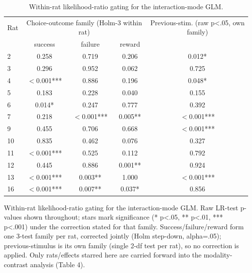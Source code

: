 \begin{table}[htbp]
\centering
\caption{Within-rat likelihood-ratio gating for the interaction-mode GLM.}
\label{tab:lr_gating}
\begin{tabular}{lcccc}
\toprule
Rat & \multicolumn{3}{c}{Choice-outcome family (Holm-3 within rat)} & Previous-stim. (raw p<.05, own family) \\
 & success & failure & reward &  \\
\midrule
2 & 0.258 & 0.719 & 0.206 & 0.012* \\
3 & 0.296 & 0.952 & 0.062 & 0.725 \\
4 & $<$0.001*** & 0.886 & 0.196 & 0.048* \\
5 & 0.183 & 0.228 & 0.040 & 0.155 \\
6 & 0.014* & 0.247 & 0.777 & 0.392 \\
7 & 0.218 & $<$0.001*** & 0.005** & $<$0.001*** \\
9 & 0.455 & 0.706 & 0.668 & $<$0.001*** \\
10 & 0.835 & 0.462 & 0.076 & 0.327 \\
11 & $<$0.001*** & 0.525 & 0.112 & 0.792 \\
12 & 0.445 & 0.886 & 0.001** & 0.924 \\
13 & $<$0.001*** & 0.003** & 1.000 & $<$0.001*** \\
16 & $<$0.001*** & 0.007** & 0.037* & 0.856 \\
\bottomrule
\end{tabular}
\vspace{4pt}
\par\noindent
\begin{minipage}{\linewidth}\small Within-rat likelihood-ratio gating for the interaction-mode GLM. Raw LR-test p-values shown throughout; stars mark significance (* p<.05, ** p<.01, *** p<.001) under the correction stated for that family. Success/failure/reward form one 3-test family per rat, corrected jointly (Holm step-down, alpha=.05); previous-stimulus is its own family (single 2-df test per rat), so no correction is applied. Only rats/effects starred here are carried forward into the modality-contrast analysis (Table 4).\end{minipage}
\end{table}